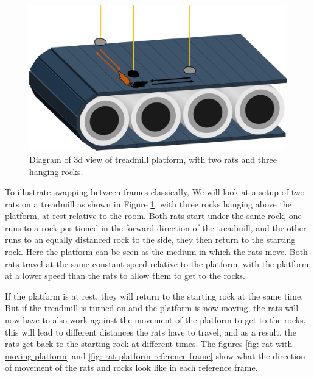 \begin{figure}[H]
	\centering
	\includegraphics[width=\textwidth]{images/pdf/Conveyor_belt_3d.pdf}
	\caption{Diagram of 3d view of treadmill platform, with two rats and three hanging rocks.}
	\label{fig: 3d conveyor belt}
\end{figure}

To illustrate swapping between frames classically, We will look at a setup of two rats on a treadmill as shown in Figure \ref{fig: 3d conveyor belt}, with three rocks hanging above the platform, at rest relative to the room. Both rats start under the same rock, one runs to a rock positioned in the forward direction of the treadmill, and the other runs to an equally distanced rock to the side, they then return to the starting rock. Here the platform can be seen as the medium in which the rats move. Both rats travel at the same constant speed relative to the platform, with the platform at a lower speed than the rats to allow them to get to the rocks.

If the platform is at rest, they will return to the starting rock at the same time. But if the treadmill is turned on and the platform is now moving, the rats will now have to also work against the movement of the platform to get to the rocks, this will lead to different distances the rats have to travel, and as a result, the rats get back to the starting rock at different times. The figures \ref{fig: rat with moving platform} and \ref{fig: rat platform reference frame} show what the direction of movement of the rats and rocks look like in each \hyperlink{def-Reference-frame}{reference frame}.

